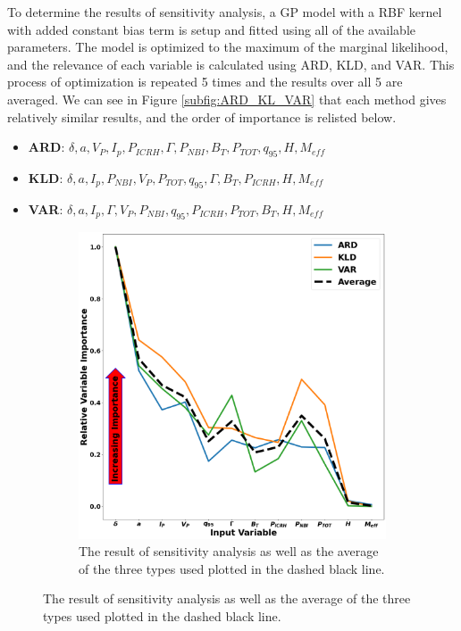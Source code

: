 \documentclass[a4paper, twoside, final, 12pt]{article}
\begin{document}
{To determine the results of sensitivity analysis, a GP model with a RBF kernel with added constant bias term is setup and fitted using all of the available parameters. The model is optimized to the maximum of the marginal likelihood, and the relevance of each variable is calculated using ARD, KLD, and VAR. This process of optimization is repeated 5 times and the results over all 5 are averaged. We can see in Figure \ref{subfig:ARD_KL_VAR} that each method gives relatively similar results, and the order of importance is relisted below.  
\begin{itemize}
	\item \textbf{ARD}: $\delta, a, V_P,  I_p, P_{ICRH}, \Gamma, P_{NBI},  B_T, P_{TOT}, q_{95}, H, M_{eff}$
	\item \textbf{KLD}: $\delta, a,  I_p, P_{NBI}, V_P, P_{TOT},  q_{95}, \Gamma, B_T, P_{ICRH}, H, M_{eff}$
	\item \textbf{VAR}: $\delta, a, I_p, \Gamma, V_P, P_{NBI}, q_{95}, P_{ICRH}, P_{TOT}, B_T, H, M_{eff}$
\end{itemize}
\begin{figure}
	\begin{subfigure}{0.48\linewidth}
		\centering
		\includegraphics[scale=0.2]{ ./src/GP_sensitivity_analysis_final_v1}
		\caption{The result of sensitivity analysis as well as the average of the three types used plotted in the dashed black line. }

\end{subfigure}
\end{figure}}
\end{document}
